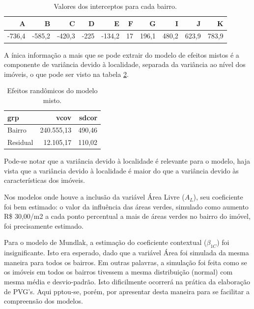 \documentclass[
  a4paper, 12pt]{article}
\begin{document}
\begin{table}[H]

\caption{\label{tab:somaitcpt}Valores dos interceptos para cada bairro.}
\centering
\fontsize{10}{12}\selectfont
\begin{tabular}[t]{rrrrrrrrrr}
\toprule
A & B & C & D & E & F & G & I & J & K\\
\midrule
\rowcolor{gray!6}  -736,4 & -585,2 & -420,3 & -225 & -134,2 & 17 & 196,1 & 480,2 & 623,9 & 783,9\\
\bottomrule
\end{tabular}
\end{table}

A ínica informação a mais que se pode extrair do modelo de efeitos
mistos é a componente de variância devido à localidade, separada da
variância ao nível dos imóveis, o que pode ser visto na tabela
\ref{tab:variancias}.

\begin{table}[H]

\caption{\label{tab:variancias}Efeitos randômicos do modelo misto.}
\centering
\begin{tabular}[t]{lrr}
\toprule
grp & vcov & sdcor\\
\midrule
\rowcolor{gray!6}  Bairro & 240.555,13 & 490,46\\
Residual & 12.105,17 & 110,02\\
\bottomrule
\end{tabular}
\end{table}

Pode-se notar que a variância devido à localidade é relevante para o
modelo, haja vista que a variância devido à localidade é maior do que a
variância devido às características dos imóveis.

Nos modelos onde houve a inclusão da variável Área Livre (\(A_L\)), seu
coeficiente foi bem estimado: o valor da influência das áreas verdes,
simulado como aumento R\$ 30,00/m2 a cada ponto percentual a mais de
áreas verdes no bairro do imóvel, foi precisamente estimado.

Para o modelo de Mundlak, a estimação do coeficiente contextual
(\(\beta_{1C}\)) foi insignificante. Isto era esperado, dado que a
variável Área foi simulada da mesma maneira para todos os bairros. Em
outras palavras, a simulação foi feita como se os imóveis em todos os
bairros tivessem a mesma distribuição (normal) com mesma média e
desvio-padrão. Isto dificilmente ocorrerá na prática da elaboração de
PVG's. Aqui pptou-se, porém, por apresentar desta maneira para se
facilitar a compreensão dos modelos.
\end{document}
